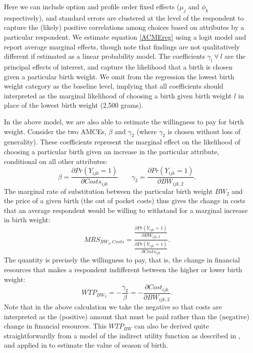 \documentclass[a4paper, 11pt]{article}
\begin{document}
\begin{spacing}{1.4}
Here we can include option and profile order fixed effects ($\mu_j$ and
$\phi_k$ respectively), %
and standard errors are clustered at the level of the respondent to capture the (likely) positive correlations
among choices based on attributes by a particular respondent. We estimate
equation \ref{ACMEreg} using a logit model and report average marginal
effects, though note that findings are not qualitatively different if
estimated as a linear probability model.
The coefficients $\gamma_l \ \forall\ l$ are the principal effects of interest,
and capture the likelihood that a birth is chosen given a particular birth
weight.  We omit from the regression the lowest birth weight category as the
baseline level, implying that all coefficients should interpreted as the
marginal likelihood of choosing a birth given birth weight $l$ in place of
the lowest birth weight (2,500 grams).

In the above model, we are also able to estimate the willingness to pay for birth weight.  Consider the two AMCEs, $\beta$ and $\gamma_2$
(where $\gamma_2$ is chosen without loss of generality).  These coefficients
represent the marginal effect on the likelihood of choosing a particular birth
given an increase in the particular attribute, conditional on all other
attributes:
\[
\beta=\frac{\partial Pr(Y_{ijk}=1)}{\partial Costs_{ijk}} \qquad \gamma_2=\frac{\partial Pr(Y_{ijk}=1)}{\partial BW_{ijk,2}}.
\]
The marginal rate of substitution between the particular birth weight $BW_2$
and the price of a given birth (the out of pocket costs) thus gives the change
in costs that an average respondent would be willing to withstand for a marginal
increase in birth weight:
\[
MRS_{BW_2,Costs}=\frac{\frac{\partial Pr(Y_{ijk}=1)}{\partial BW_{ijk,2}}}{\frac{\partial Pr(Y_{ijk}=1)}{\partial Costs_{ijk}}}.
\]
The quantity is precisely the willingness to pay, that is, the change in financial
resources that makes a respondent indifferent between the higher or lower birth
weight:
\[
WTP_{BW_2}=-\frac{\gamma_2}{\beta}=-\frac{\partial Cost_{ijk}}{\partial BW_{ijk,2}}.
\]
Note that in the above calculation we take the negative so that costs are
interpreted as the (positive) amount that must be paid rather than the
(negative) change in financial resources.  This $WTP_{BW}$ can also be
derived quite straightforwardly from a model of the indirect utility
function as described in \citet{Zweifeletal2009}, and applied in
\citet{Clarkeetal2016} to estimate the value of season of birth.


\end{spacing}
\end{document}
